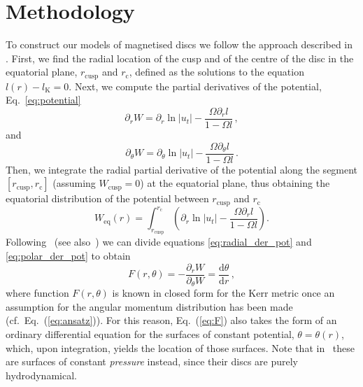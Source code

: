 \documentclass[referee]{aa}
\begin{document}
\section{Methodology}
\label{methodology}

To construct our models of magnetised discs we follow the approach described in \citet{Qian:2009}. First, we find the radial location of the cusp and of the centre of the disc in the equatorial plane, $r_{\mathrm{cusp}}$ and $r_{\mathrm{c}}$, defined as the solutions to the equation $l(r) - l_{\mathrm{K}} = 0$.
Next, we compute the partial derivatives of the potential, Eq.~\eqref{eq:potential}
\begin{equation}\label{eq:radial_der_pot}
\partial_r W = \partial_r \ln|u_t| - \frac{\Omega \partial_rl}{1 - \Omega l}\,,
\end{equation}
and
\begin{equation}\label{eq:polar_der_pot}
\partial_{\theta} W = \partial_{\theta} \ln|u_t| - \frac{\Omega \partial_{\theta}l}{1 - \Omega l}\,.
\end{equation}
Then, we integrate the radial partial derivative of the potential along the segment $[r_{\mathrm{cusp}}, r_{\mathrm{c}}]$ (assuming $W_{\mathrm{cusp}} = 0$) at the equatorial plane, thus obtaining the equatorial distribution of the potential between $r_{\mathrm{cusp}}$ and $r_{\mathrm{c}}$
\begin{equation}\label{eq:equatorial_pot}
W_{\mathrm{eq}}(r) = \int^{r_{\mathrm{c}}}_{r_{\mathrm{cusp}}}\left(\partial_r \ln|u_t| - \frac{\Omega \partial_rl}{1 - \Omega l}\right).
\end{equation}
Following~\citet{Qian:2009} (see also~\citet{Jaroszynski:1980}) we can divide equations \eqref{eq:radial_der_pot} and \eqref{eq:polar_der_pot} to obtain
\begin{equation}\label{eq:F}
F(r, \theta) = -\frac{\partial_r W}{\partial_{\theta} W} = \frac{\mathrm{d}\theta}{\mathrm{d}r}\,,
\end{equation}
where function $F(r, \theta)$ is known in closed form for the Kerr metric once an assumption for the angular momentum distribution has been made (cf.~Eq.~(\ref{eq:ansatz})). For this reason, Eq.~(\ref{eq:F}) also takes the form of an ordinary differential equation for the surfaces of constant potential, $\theta=\theta(r)$, which, upon integration, yields the location of those surfaces. Note that in~\citet{Qian:2009} these are surfaces of constant {\it pressure} instead, since their discs are purely hydrodynamical.
\end{document}
